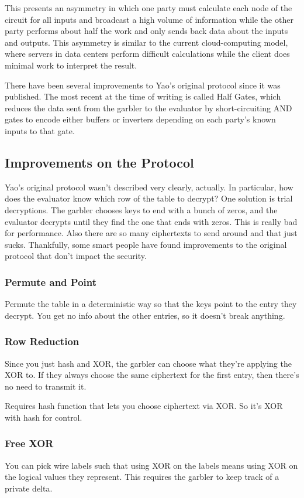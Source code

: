 This presents an asymmetry in which one party must calculate each node of the circuit for all inputs and broadcast a high volume of information while the other party performs about half the work and only sends back data about the inputs and outputs. This asymmetry is similar to the current cloud-computing model, where servers in data centers perform difficult calculations while the client does minimal work to interpret the result.

There have been several improvements to Yao's original protocol since it was published. The most recent at the time of writing is called Half Gates\cite{HalfGates}, which reduces the data sent from the garbler to the evaluator by short-circuiting AND gates to encode either buffers or inverters depending on each party's known inputs to that gate.

\subsection{Improvements on the Protocol}
Yao's original protocol wasn't described very clearly, actually. In particular, how does the evaluator know which row of the table to decrypt? One solution is trial decryptions. The garbler chooses keys to end with a bunch of zeros, and the evaluator decrypts until they find the one that ends with zeros. This is really bad for performance. Also there are so many ciphertexts to send around and that just sucks. Thankfully, some smart people have found improvements to the original protocol that don't impact the security.

\subsubsection{Permute and Point}
Permute the table in a deterministic way so that the keys point to the entry they decrypt. You get no info about the other entries, so it doesn't break anything.

\subsubsection{Row Reduction}
Since you just hash and XOR, the garbler can choose what they're applying the XOR to. If they always choose the same ciphertext for the first entry, then there's no need to transmit it.

Requires hash function that lets you choose ciphertext via XOR. So it's XOR with hash for control.

\subsubsection{Free XOR}
You can pick wire labels such that using XOR on the labels means using XOR on the logical values they represent. This requires the garbler to keep track of a private delta.

